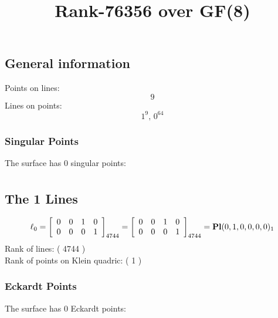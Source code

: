 \documentclass{article}
\newcommand\setTBstruts{\def\T{\rule{0pt}{2.6ex}}%
\def\B{\rule[-1.2ex]{0pt}{0pt}}}
\begin{document}
 
\setTBstruts



{\allowdisplaybreaks%






\title{Rank-76356 over GF(8)}
\author{}%
\maketitle%
%
{}



\subsection*{General information}
Points on lines:
$$
9$$
Lines on points:
$$
1^9,\,0^{64}$$
\subsubsection*{Singular Points}
The surface has 0 singular points:\\
\begin{align*}
\end{align*}
\subsection*{The 1 Lines}
$$
\ell_{0} = 
\left[
\begin{array}{*{4}{r}}
0 & 0 & 1 & 0\\
0 & 0 & 0 & 1\\
\end{array}
\right]
_{4744}
=
\left[
\begin{array}{*{4}c}
0  & 0  & 1  & 0\\
0  & 0  & 0  & 1\\
\end{array}
\right]_{4744}
={\rm\bf Pl}(0,1,0,0,0,0 )_{1}$$
Rank of lines: ( 4744 )\\
Rank of points on Klein quadric: ( 1 )\\
\subsubsection*{Eckardt Points}
The surface has 0 Eckardt points:\\
}
\end{document}
